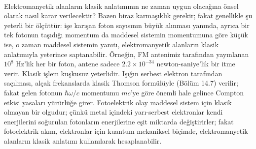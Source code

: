 \

Elektromanyetik alanların klasik anlatımının ne zaman uygun olacağına önsel olarak nasıl karar verilecektir? Bazen biraz karmaşıklık gerekir; fakat genellikle şu yeterli bir ölçüttür: işe karışan foton sayısının büyük alınması yanında, ayrıca bir tek fotonun taşıdığı momentum da maddesel sistemin momentumuna göre küçük ise, o zaman maddesel sistemin yanıtı, elektromanyetik alanların klasik anlatımıyla yeterince saptanabilir. Örneğin, FM antenimiz tarafından yayınlanan $10^{8}$ Hz'lik her bir foton, antene sadece $2.2 \times 10^{-34}$ newton-saniye'lik bir itme verir. Klasik işlem kuşkusuz yeterlidir. Işığın serbest elektron tarafından saçılması, alçak frekanslarda klasik Thomson formülüyle (Bölüm 14.7) verilir; fakat gelen fotonun $\hbar\omega / c$ momentumu $mc$'ye göre önemli hale gelince Compton etkisi yasaları yürürlüğe girer. Fotoelektrik olay maddesel sistem için klasik olmayan bir olgudur; çünkü metal içindeki yarı-serbest elektronlar kendi enerjilerini soğurulan fotonların enerjilerine eşit miktarda değiştirirler; fakat fotoelektrik akım, elektronlar için kuantum mekaniksel biçimde, elektromanyetik alanların klasik anlatımı kullanılarak hesaplanabilir.